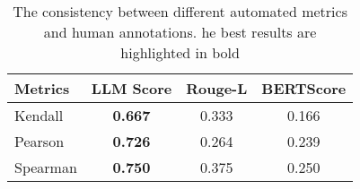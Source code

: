 \begin{table}[t]
\centering
\begin{tabular}{lccc}
\hline
Metrics  & \multicolumn{1}{c}{LLM Score} & \multicolumn{1}{c}{Rouge-L} & \multicolumn{1}{c}{BERTScore} \\ \hline
Kendall  & \textbf{0.667}                & 0.333                       & 0.166                         \\
Pearson  & \textbf{0.726}                & 0.264                       & 0.239                         \\
Spearman & \textbf{0.750}                & 0.375                       & 0.250                         \\ \hline
\end{tabular}
\caption{The consistency between different automated metrics and human annotations. he best results are highlighted in bold}
\label{coefficient}
\end{table}







